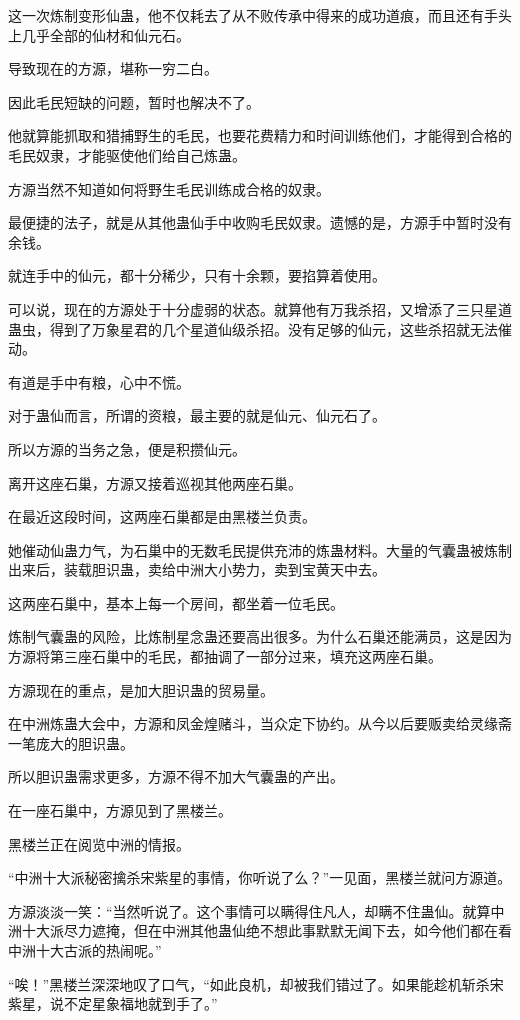 \begin{this_body}
这一次炼制变形仙蛊，他不仅耗去了从不败传承中得来的成功道痕，而且还有手头上几乎全部的仙材和仙元石。

导致现在的方源，堪称一穷二白。

因此毛民短缺的问题，暂时也解决不了。

他就算能抓取和猎捕野生的毛民，也要花费精力和时间训练他们，才能得到合格的毛民奴隶，才能驱使他们给自己炼蛊。

方源当然不知道如何将野生毛民训练成合格的奴隶。

最便捷的法子，就是从其他蛊仙手中收购毛民奴隶。遗憾的是，方源手中暂时没有余钱。

就连手中的仙元，都十分稀少，只有十余颗，要掐算着使用。

可以说，现在的方源处于十分虚弱的状态。就算他有万我杀招，又增添了三只星道蛊虫，得到了万象星君的几个星道仙级杀招。没有足够的仙元，这些杀招就无法催动。

有道是手中有粮，心中不慌。

对于蛊仙而言，所谓的资粮，最主要的就是仙元、仙元石了。

所以方源的当务之急，便是积攒仙元。

离开这座石巢，方源又接着巡视其他两座石巢。

在最近这段时间，这两座石巢都是由黑楼兰负责。

她催动仙蛊力气，为石巢中的无数毛民提供充沛的炼蛊材料。大量的气囊蛊被炼制出来后，装载胆识蛊，卖给中洲大小势力，卖到宝黄天中去。

这两座石巢中，基本上每一个房间，都坐着一位毛民。

炼制气囊蛊的风险，比炼制星念蛊还要高出很多。为什么石巢还能满员，这是因为方源将第三座石巢中的毛民，都抽调了一部分过来，填充这两座石巢。

方源现在的重点，是加大胆识蛊的贸易量。

在中洲炼蛊大会中，方源和凤金煌赌斗，当众定下协约。从今以后要贩卖给灵缘斋一笔庞大的胆识蛊。

所以胆识蛊需求更多，方源不得不加大气囊蛊的产出。

在一座石巢中，方源见到了黑楼兰。

黑楼兰正在阅览中洲的情报。

“中洲十大派秘密擒杀宋紫星的事情，你听说了么？”一见面，黑楼兰就问方源道。

方源淡淡一笑：“当然听说了。这个事情可以瞒得住凡人，却瞒不住蛊仙。就算中洲十大派尽力遮掩，但在中洲其他蛊仙绝不想此事默默无闻下去，如今他们都在看中洲十大古派的热闹呢。”

“唉！”黑楼兰深深地叹了口气，“如此良机，却被我们错过了。如果能趁机斩杀宋紫星，说不定星象福地就到手了。”


\end{this_body}
